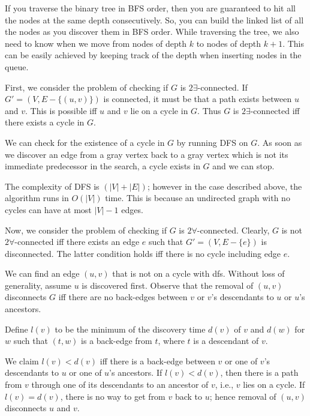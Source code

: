 If you traverse the binary tree in BFS order,
then you are guaranteed to hit all the nodes at the same depth
consecutively. So, you can build the linked list of all the nodes as you
discover them in BFS order. While traversing the tree, we also need to know when we move from
nodes of depth $k$ to nodes of depth $k + 1$. This can be easily
achieved by keeping track of the depth when inserting nodes in
the queue.

First, we consider the problem of checking if 
$G$ is $2\exists$-connected.
If $G' = (V, E- \{(u,v)\})$ is connected, it must be that a path exists between $u$ and $v$.
This is possible iff $u$ and $v$ lie on a cycle in $G$.  Thus $G$ is $2\exists$-connected
iff there exists a cycle in $G$.

We can check for the existence of a cycle in $G$ by running DFS on $G$.  As soon as
we discover an  edge from a gray vertex back to a gray vertex which is not its immediate
predecessor in the search, a cycle exists in $G$ and we can stop.

The complexity of DFS is $(|V| + |E|)$; however in the case described above,
the algorithm runs in $O(|V|)$ time. This is because an undirected
graph with no cycles can have at most $|V|-1$ edges.


Now, we consider the problem of checking if $G$ is $2\forall$-connected.
 Clearly, $G$ is not $2\forall$-connected iff there exists an edge $e$
 such that $G' = (V, E-\{e\})$ is disconnected.
 The latter condition holds iff there is no cycle including edge $e$.

 We can find an edge $(u,v)$ that is not on a cycle with dfs.
 Without loss of generality, assume $u$ is discovered first.
 Observe that the removal of $(u,v)$ disconnects $G$ iff there are no back-edges
 between $v$ or $v$'s descendants to $u$ or $u$'s ancestors.

 Define $l(v)$ to be the minimum of the discovery time $d(v)$ of $v$ and
 $d(w)$ for $w$ such that $(t,w)$ is a back-edge from $t$, where $t$ is a
 descendant of $v$.

 We claim $l(v) < d(v)$ iff there is a back-edge between $v$ or one of $v$'s descendants 
 to $u$ or one of $u$'s ancestors.
 If $l(v) < d(v)$, then there is a path from $v$ through one of its descendants 
 to an ancestor of $v$, i.e., $v$ lies on a cycle. 
 If $l(v) = d(v)$, there is no way to get from $v$ back to $u$; hence
 removal of $(u,v)$ disconnects $u$ and $v$.

